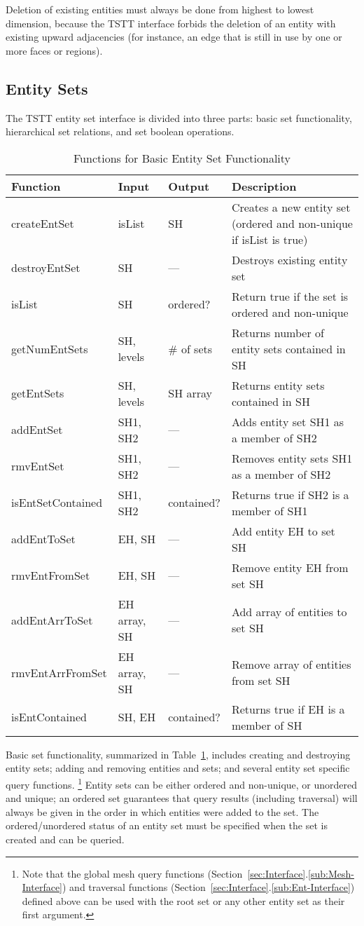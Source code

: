 Deletion of existing entities must always be done from highest to
lowest dimension, because the TSTT interface forbids the deletion
of an entity with existing upward adjacencies (for instance, an edge
that is still in use by one or more faces or regions).

\subsection{Entity Sets\label{sub:Entity-Set-Interface}}

The TSTT entity set interface is divided into three parts: basic set
functionality, hierarchical set relations, and set boolean operations.

\begin{table}[tbp]
\caption{Functions for Basic Entity Set Functionality}\label{table:EntSet}
{\small
\begin{tabular}{|p{1.25in}|p{0.75in}|p{0.75in}|p{223pt}|}
\hline 
Function&
Input&
Output&
Description\tabularnewline
\hline
\hline 
createEntSet&
isList&
SH&
Creates a new entity set (ordered and non-unique if isList is true)\tabularnewline
\hline 
destroyEntSet&
SH&
---&
Destroys existing entity set\tabularnewline
\hline 
isList&
SH&
ordered?&
Return true if the set is ordered and non-unique\tabularnewline
\hline 
\hline 
getNumEntSets&
SH, levels&
\# of sets&
Returns number of entity sets contained in SH\tabularnewline
\hline 
getEntSets&
SH, levels&
SH array&
Returns entity sets contained in SH\tabularnewline
\hline 
addEntSet&
SH1, SH2&
---&
Adds entity set SH1 as a member of SH2\tabularnewline
\hline 
rmvEntSet&
SH1, SH2&
---&
Removes entity sets SH1 as a member of SH2\tabularnewline
\hline 
isEntSetContained&
SH1, SH2&
contained?&
Returns true if SH2 is a member of SH1\tabularnewline
\hline 
\hline 
addEntToSet&
EH, SH&
---&
Add entity EH to set SH\tabularnewline
\hline 
rmvEntFromSet&
EH, SH&
---&
Remove entity EH from set SH\tabularnewline
\hline 
addEntArrToSet&
EH array, SH&
---&
Add array of entities to set SH\tabularnewline
\hline 
rmvEntArrFromSet&
EH array, SH&
---&
Remove array of entities from set SH\tabularnewline
\hline
isEntContained&
SH, EH&
contained?&
Returns true if EH is a member of SH\tabularnewline
\hline
\end{tabular}
}
\end{table}

Basic set functionality, summarized in Table~\ref{table:EntSet}, includes
creating and destroying entity sets; adding and removing entities and
sets; and several entity set specific query functions.  \footnote{Note
that the global mesh query functions (Section~\ref{sec:Interface}.\ref{sub:Mesh-Interface})
and traversal functions (Section~\ref{sec:Interface}.\ref{sub:Ent-Interface}) defined above
can be used with the root set or any other entity set as their first
argument.} Entity sets can be either ordered and non-unique, or
unordered and unique; an ordered set guarantees that query results
(including traversal) will always be given in the order in which
entities were added to the set. The ordered/unordered status of an
entity set must be specified when the set is created and can be queried.

